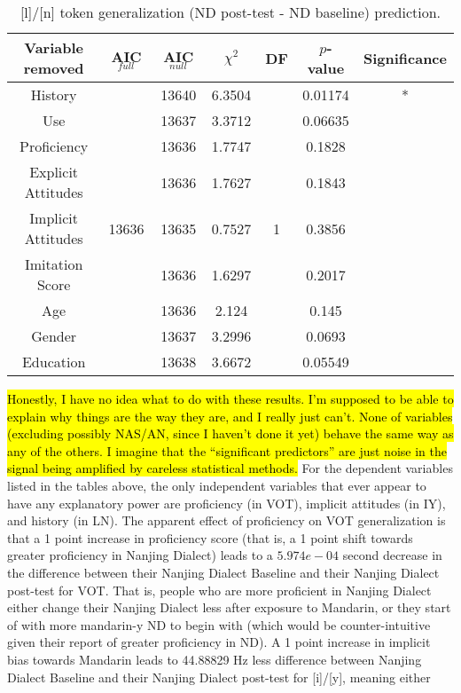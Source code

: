 \begin{table}
\centering
 \begin{tabular}{|c||c|c|c|c|c|c|} 
 \hline
 \textbf{Variable removed} & \textbf{AIC$_{full}$} & \textbf{AIC$_{null}$} & $\chi^2$ & \textbf{DF} & \textbf{$p$-value} & \textbf{Significance}\\ [0.5ex] 
 \hline
  History & \multirow{9}{*}{13636} & 13640 & 6.3504 & \multirow{9}{*}{1} & 0.01174 & *\\ 
 \cline{1-1}\cline{3-4}\cline{6-7}
 Use &  & 13637 & 3.3712 &  & 0.06635 & \\
 \cline{1-1}\cline{3-4}\cline{6-7}
 Proficiency &  & 13636 & 1.7747 &  & 0.1828 & \\
 \cline{1-1}\cline{3-4}\cline{6-7}
 Explicit Attitudes &  & 13636 & 1.7627 &  & 0.1843 & \\
 \cline{1-1}\cline{3-4}\cline{6-7}
 Implicit Attitudes &  & 13635 & 0.7527 &  & 0.3856 & \\
 \cline{1-1}\cline{3-4}\cline{6-7}
 Imitation Score &  & 13636 & 1.6297 &  & 0.2017 & \\
 \cline{1-1}\cline{3-4}\cline{6-7}
 Age &  & 13636 & 2.124 &  & 0.145 & \\
 \cline{1-1}\cline{3-4}\cline{6-7}
 Gender &  & 13637 & 3.2996 &  & 0.0693 & \\
 \cline{1-1}\cline{3-4}\cline{6-7}
 Education &  & 13638 & 3.6672 &  & 0.05549 & \\
 \hline
\end{tabular}
\caption{[l]/[n] token generalization (ND post-test - ND baseline) prediction.}
\label{tab:LNtokengnPredictors}
\end{table}

\hl{Honestly, I have no idea what to do with these results. I'm supposed to be able to explain why things are the way they are, and I really just can't. None of variables (excluding possibly NAS/AN, since I haven't done it yet) behave the same way as any of the others. I imagine that the ``significant predictors'' are just noise in the signal being amplified by careless statistical methods.} For the dependent variables listed in the tables above, the only independent variables that ever appear to have any explanatory power are proficiency (in VOT), implicit attitudes (in IY), and history (in LN). The apparent effect of proficiency on VOT generalization is that a 1 point increase in proficiency score (that is, a 1 point shift towards greater proficiency in Nanjing Dialect) leads to a $5.974e-04$ second decrease in the difference between their Nanjing Dialect Baseline and their Nanjing Dialect post-test for VOT. That is, people who are more proficient in Nanjing Dialect either change their Nanjing Dialect less after exposure to Mandarin, or they start of with more mandarin-y ND to begin with (which would be counter-intuitive given their report of greater proficiency in ND). A 1 point increase in implicit bias towards Mandarin leads to 44.88829 Hz less difference between Nanjing Dialect Baseline and their Nanjing Dialect post-test for [i]/[y], meaning either 

